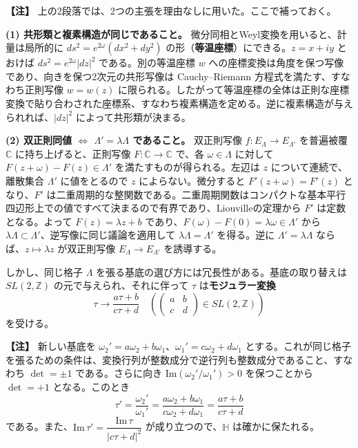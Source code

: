 \documentclass[uplatex, dvipdfmx, book]{jsbook}
\newenvironment{note}{\vspace{1ex}\par\footnotesize\noindent\textbf{【注】}}{\par\vspace{1ex}}
\begin{document}
\begin{note}
上の2段落では、2つの主張を理由なしに用いた。ここで補っておく。

\textbf{(1) 共形類と複素構造が同じであること。}
微分同相とWeyl変換を用いると、計量は局所的に $ds^2 = e^{2\omega}(dx^2 + dy^2)$ の形（\textbf{等温座標}）にできる。$z = x + iy$ とおけば $ds^2 = e^{2\omega}|dz|^2$ である。別の等温座標 $w$ への座標変換は角度を保つ写像であり、向きを保つ2次元の共形写像は Cauchy--Riemann 方程式を満たす、すなわち正則写像 $w = w(z)$ に限られる。したがって等温座標の全体は正則な座標変換で貼り合わされた座標系、すなわち複素構造を定める。逆に複素構造が与えられれば、$|dz|^2$ によって共形類が決まる。

\textbf{(2) 双正則同値 $\Leftrightarrow$ $\Lambda' = \lambda\Lambda$ であること。}
双正則写像 $f: E_\Lambda \to E_{\Lambda'}$ を普遍被覆 $\mathbb{C}$ に持ち上げると、正則写像 $F: \mathbb{C} \to \mathbb{C}$ で、各 $\omega \in \Lambda$ に対して $F(z + \omega) - F(z) \in \Lambda'$ を満たすものが得られる。左辺は $z$ について連続で、離散集合 $\Lambda'$ に値をとるので $z$ によらない。微分すると $F'(z + \omega) = F'(z)$ となり、$F'$ は二重周期的な整関数である。二重周期関数はコンパクトな基本平行四辺形上での値ですべて決まるので有界であり、Liouvilleの定理から $F'$ は定数となる。よって $F(z) = \lambda z + b$ であり、$F(\omega) - F(0) = \lambda\omega \in \Lambda'$ から $\lambda\Lambda \subset \Lambda'$、逆写像に同じ議論を適用して $\lambda\Lambda = \Lambda'$ を得る。逆に $\Lambda' = \lambda\Lambda$ ならば、$z \mapsto \lambda z$ が双正則写像 $E_\Lambda \to E_{\Lambda'}$ を誘導する。
\end{note}

しかし、同じ格子 $\Lambda$ を張る基底の選び方には冗長性がある。基底の取り替えは $SL(2, \mathbb{Z})$ の元で与えられ、それに伴って $\tau$ は\textbf{モジュラー変換}
\begin{equation}
    \tau \to \frac{a\tau + b}{c\tau + d} \quad \left(
    \begin{pmatrix} a & b \\ c & d \end{pmatrix} \in SL(2, \mathbb{Z})
    \right)
\end{equation}
を受ける。

\begin{note}
新しい基底を $\omega_2' = a\omega_2 + b\omega_1$、$\omega_1' = c\omega_2 + d\omega_1$ とする。これが同じ格子を張るための条件は、変換行列が整数成分で逆行列も整数成分であること、すなわち $\det = \pm 1$ である。さらに向き $\mathrm{Im}(\omega_2'/\omega_1') > 0$ を保つことから $\det = +1$ となる。このとき
\begin{equation*}
    \tau' = \frac{\omega_2'}{\omega_1'} = \frac{a\omega_2 + b\omega_1}{c\omega_2 + d\omega_1} = \frac{a\tau + b}{c\tau + d}
\end{equation*}
である。また、$\mathrm{Im}\,\tau' = \dfrac{\mathrm{Im}\,\tau}{|c\tau + d|^2}$ が成り立つので、$\mathbb{H}$ は確かに保たれる。
\end{note}
\end{document}
